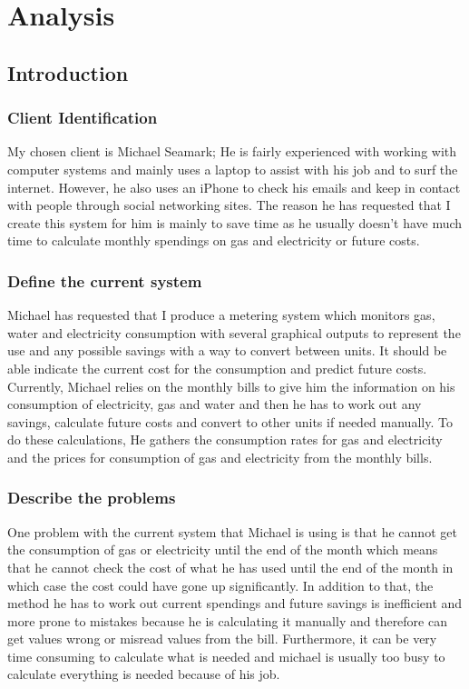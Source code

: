 \chapter{Analysis}

\section{Introduction}
\subsection{Client Identification}
My chosen client is Michael Seamark; He is fairly experienced with working with computer systems and mainly uses a laptop to assist with his job and to surf the internet. However, he also uses an iPhone to check his emails and keep in contact with people through social networking sites. The reason he has requested that I create this system for him is mainly to save time as he usually doesn't have much time to calculate monthly spendings on gas and electricity or future costs.

\subsection{Define the current system}
Michael has requested that I produce a metering system which monitors gas, water and electricity consumption with several graphical outputs to represent the use and any possible savings with a way to convert between units. It should be able indicate the current cost for the consumption and predict future costs. Currently, Michael relies on the monthly bills to give him the information on his consumption of electricity, gas and water and then he has to work out any savings, calculate future costs and convert to other units if needed manually. To do these calculations, He gathers the consumption rates for gas and electricity and the prices for consumption of gas and electricity from the monthly bills.

\subsection{Describe the problems}
One problem with the current system that Michael is using is that he cannot get the consumption of gas or electricity until the end of the month which means that he cannot check the cost of what he has used until the end of the month in which case the cost could have gone up significantly. In addition to that, the method he has to work out current spendings and future savings is inefficient and more prone to mistakes because he is calculating it manually and therefore can get values wrong or misread values from the bill. Furthermore, it can be very time consuming to calculate what is needed and michael is usually too busy to calculate everything is needed because of his job.


